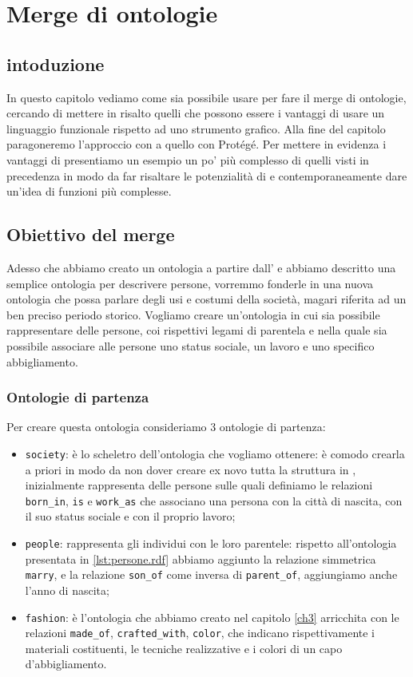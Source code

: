\chapter{Merge di ontologie}
\label{ch4}
\section*{intoduzione}
In questo capitolo vediamo come sia possibile usare \cduce per fare il merge di ontologie, cercando di mettere in risalto quelli che possono essere i vantaggi di usare un linguaggio funzionale rispetto ad uno strumento grafico. Alla fine del capitolo paragoneremo l'approccio con \cduce a quello con Protégé. Per mettere in evidenza i vantaggi di \cduce presentiamo un esempio un po' più complesso di quelli visti in precedenza in modo da far risaltare le potenzialità di \cduce e contemporaneamente dare un'idea di funzioni più complesse.

\section{Obiettivo del merge}\label{ch4.1}
Adesso che abbiamo creato un ontologia a partire dall' e abbiamo descritto una semplice ontologia per descrivere persone, vorremmo fonderle in una nuova ontologia che possa parlare degli usi e costumi della società, magari riferita ad un ben preciso periodo storico. Vogliamo creare un'ontologia in cui sia possibile rappresentare delle persone, coi rispettivi legami di parentela e nella quale sia possibile associare alle persone uno status sociale, un lavoro e uno specifico abbigliamento.
\subsection{Ontologie di partenza}
Per creare questa ontologia consideriamo 3 ontologie di partenza:
\begin{itemize}
	\item \verb|society|: è lo scheletro dell'ontologia che vogliamo ottenere: è comodo crearla a priori in modo da non dover creare ex novo tutta la struttura in \cduce, inizialmente rappresenta delle persone sulle quali definiamo le relazioni \verb|born_in|, \verb|is| e \verb|work_as| che associano una persona con la città di nascita, con il suo status sociale e con il proprio lavoro;
	\item \verb|people|: rappresenta gli individui con le loro parentele: rispetto all'ontologia presentata in \ref{lst:persone.rdf} abbiamo aggiunto la relazione simmetrica \verb|marry|, e la relazione \verb|son_of| come inversa di \verb|parent_of|, aggiungiamo anche l'anno di nascita;
	\label{ont_fashion}
	\item \verb|fashion|: è l'ontologia che abbiamo creato nel capitolo \ref{ch3} arricchita con le relazioni \verb|made_of|, \verb|crafted_with|, \verb|color|, che indicano rispettivamente i materiali costituenti, le tecniche realizzative e i colori di un capo d'abbigliamento.
\end{itemize}
